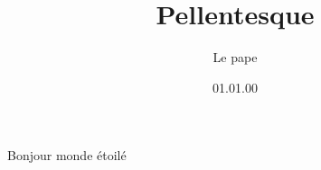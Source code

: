 \documentclass[titlepage,twocolumn, french]{article}
\title{Pellentesque}
\author{Le pape}
\date{01.01.00}
\begin{document}
\maketitle

\languagename

Bonjour monde étoilé

\blindtext[5]


\newpage

\blindtext[5]
\end{document}
